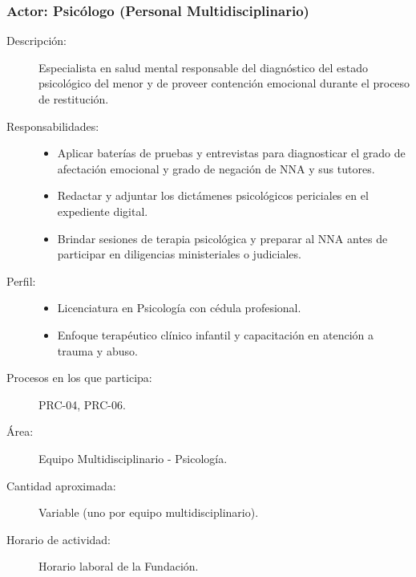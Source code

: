 \subsubsection{Actor: Psicólogo (Personal Multidisciplinario)}
\begin{description}
	\item[Descripción:] Especialista en salud mental responsable del diagnóstico del estado psicológico del menor y de proveer contención emocional durante el proceso de restitución.
	\item[Responsabilidades:] \cdtEmpty
	\begin{itemize}
		\item Aplicar baterías de pruebas y entrevistas para diagnosticar el grado de afectación emocional y grado de negación de NNA y sus tutores.
		\item Redactar y adjuntar los dictámenes psicológicos periciales en el expediente digital.
		\item Brindar sesiones de terapia psicológica y preparar al NNA antes de participar en diligencias ministeriales o judiciales.
	\end{itemize}
	\item[Perfil:] \cdtEmpty
	\begin{itemize}
		\item Licenciatura en Psicología con cédula profesional.
		\item Enfoque terapéutico clínico infantil y capacitación en atención a trauma y abuso.
	\end{itemize}
	\item[Procesos en los que participa:] PRC-04, PRC-06.
	\item[Área:] Equipo Multidisciplinario - Psicología.
	\item[Cantidad aproximada:] Variable (uno por equipo multidisciplinario).
	\item[Horario de actividad:] Horario laboral de la Fundación.
\end{description}

